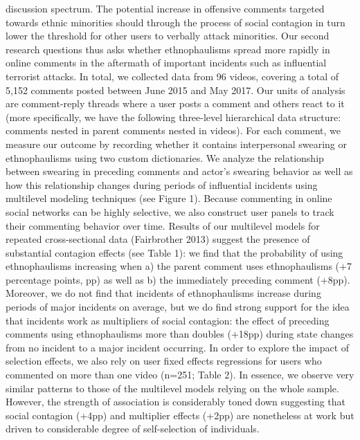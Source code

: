 discussion spectrum. The potential increase in offensive comments targeted towards ethnic minorities should through the process of social contagion in turn lower the threshold for other users to verbally attack minorities. Our second research questions thus asks whether ethnophaulisms  spread more rapidly in online comments in the aftermath of important incidents such as influential terrorist attacks. In total, we collected data from 96 videos, covering a total of 5,152 comments posted between June 2015 and May 2017. Our units of analysis are comment-reply threads where a user posts a comment and others react to it (more specifically, we have the following three-level hierarchical data structure: comments nested in parent comments nested in videos). For each comment, we measure our outcome by recording whether it contains interpersonal swearing or ethnophaulisms using two custom dictionaries. We analyze the relationship between swearing in preceding comments and actor's swearing behavior as well as how this relationship changes during periods of influential incidents using multilevel modeling techniques (see Figure 1). Because commenting in online social networks can be highly selective, we also construct user panels to track their commenting behavior over time. Results of our multilevel models for repeated cross-sectional data (Fairbrother 2013) suggest the presence of substantial contagion effects (see Table 1): we find that the probability of using ethnophaulisms increasing when a) the parent comment uses ethnophaulisms (+7 percentage points, pp) as well as b) the immediately preceding comment (+8pp). Moreover, we do not find that incidents of ethnophaulisms increase during periods of major incidents on average, but we do find strong support for the idea that incidents work as multipliers of social contagion: the effect of preceding comments using ethnophaulisms more than doubles (+18pp) during state changes from no incident to a major incident occurring. In order to explore the impact of selection effects, we also rely on user fixed effects regressions for users who commented on more than one video (n=251; Table 2). In essence, we observe very similar patterns to those of the multilevel models relying on the whole sample. However, the strength of association is considerably toned down suggesting that social contagion (+4pp) and multiplier effects (+2pp) are nonetheless at work but driven to considerable degree of self-selection of individuals.

